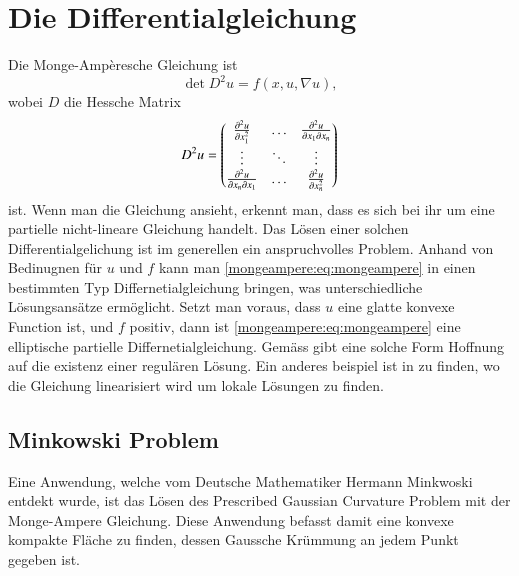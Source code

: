 %
%
%
%
\section{Die Differentialgleichung\label{mongeampere:section:teil0}}
Die Monge-Ampèresche Gleichung ist
\begin{equation}
  \det D^2 u = f(x, u, \nabla u),
  \label{mongeampere:eq:mongeampere}
\end{equation}
wobei $D$ die Hessche Matrix
\begin{equation}
  D^2 u =
  \begin{pmatrix}
    \pdv[2]{u}{x_1} & \dots &\pdv{u}{x_1}{x_n} \\
  \vdots & \ddots & \vdots \\
  \pdv{u}{x_n}{x_1} & \dots &\pdv[2]{u}{x_n} \\
  \end{pmatrix}
  \label{mongeampere:eq:hess}
\end{equation}
ist.
Wenn man die Gleichung ansieht, erkennt man, dass es sich bei ihr um eine partielle
nicht-lineare Gleichung handelt.
Das Lösen einer solchen Differentialgelichung ist im generellen ein anspruchvolles Problem.
Anhand von Bedinugnen für $u$ und $f$ kann man \eqref{mongeampere:eq:mongeampere} 
in einen bestimmten Typ Differnetialgleichung bringen, was unterschiedliche Lösungsansätze ermöglicht.
Setzt man voraus, dass $u$ eine glatte konvexe Function ist, und $f$ positiv, dann ist \eqref{mongeampere:eq:mongeampere}
eine elliptische partielle Differnetialgleichung.
Gemäss \cite{mongeampere:figalli2018mongeampereequation} gibt eine solche Form Hoffnung auf die existenz einer regulären Lösung.
Ein anderes beispiel ist in \cite{mongeampere:figalli2022prescribednegativegausscurvature} zu finden, wo die 
Gleichung linearisiert wird um lokale Lösungen zu finden.

\subsection{Minkowski Problem}
Eine Anwendung, welche vom Deutsche Mathematiker Hermann Minkwoski entdekt wurde, ist das Lösen des
Prescribed Gaussian Curvature Problem mit der Monge-Ampere Gleichung.
Diese Anwendung befasst damit eine konvexe kompakte Fläche zu finden, dessen Gaussche Krümmung 
an jedem Punkt gegeben ist.


